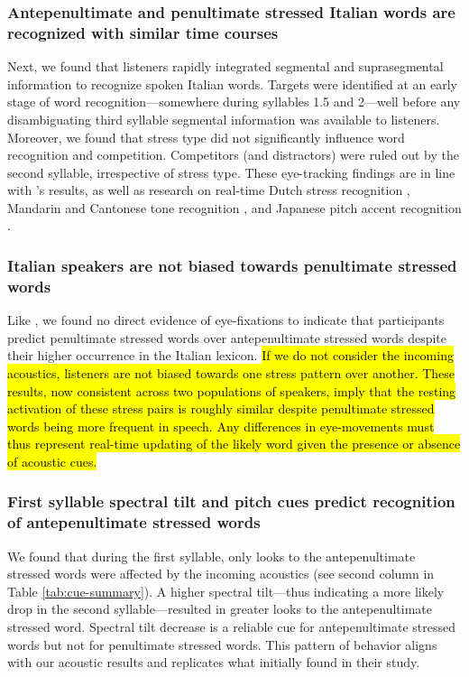 \subsubsection{Antepenultimate and penultimate stressed Italian words are recognized with similar time courses}
Next, we found that listeners rapidly integrated segmental and suprasegmental information to recognize spoken Italian words. Targets were identified at an early stage of word recognition---somewhere during syllables 1.5 and 2---well before any disambiguating third syllable segmental information was available to listeners. Moreover, we found that stress type did not significantly influence word recognition and competition. Competitors (and distractors) were ruled out by the second syllable, irrespective of stress type. These eye-tracking findings are in line with \cite{Sulpizio_McQueen_2012}'s results, as well as research on real-time Dutch stress recognition \citep{Reinisch2010}, Mandarin and Cantonese tone recognition \citep{zou_2022, qin_2022, Nixon2016}, and Japanese pitch accent recognition \citep{Ito2024}. 




\subsubsection{Italian speakers are not biased towards penultimate stressed words}
Like \cite{Sulpizio_McQueen_2012}, we found no direct evidence of eye-fixations to indicate that participants predict penultimate stressed words over antepenultimate stressed words despite their higher occurrence in the Italian lexicon. \hl{If we do not consider the incoming acoustics, listeners are not biased towards one stress pattern over another. These results, now consistent across two populations of speakers, imply that the resting activation of these stress pairs is roughly similar despite penultimate stressed words being more frequent in speech. Any differences in eye-movements must thus represent real-time updating of the likely word given the presence or absence of acoustic cues.}

\subsubsection{First syllable spectral tilt and pitch cues predict recognition of antepenultimate stressed words}
We found that during the first syllable, only looks to the antepenultimate stressed words were affected by the incoming acoustics (see second column in Table \ref{tab:cue-summary}). A higher spectral tilt---thus indicating a more likely drop in the second syllable---resulted in greater looks to the antepenultimate stressed word. Spectral tilt decrease is a reliable cue for antepenultimate stressed words but not for penultimate stressed words. This pattern of behavior aligns with our acoustic results and replicates what \citep{Sulpizio_McQueen_2012} initially found in their study. 

